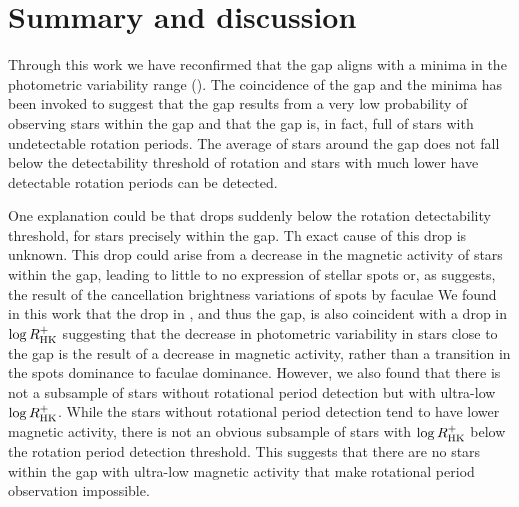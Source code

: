 \section{Summary and discussion}
\label{sec:summary}

Through this work we have reconfirmed that the gap aligns with a minima in the photometric variability range (\rper).
The coincidence of the gap and the minima has been invoked to suggest that the gap results from a very low probability of observing stars within the gap and that the gap is, in fact, full of stars with undetectable rotation periods.
The average \rper{} of stars around the gap does not fall below the detectability threshold of rotation and stars with much lower \rper{} have detectable rotation periods can be detected.

One explanation could be that \rper{} drops suddenly below the rotation detectability threshold, for stars precisely within the gap.
Th exact cause of this drop is unknown.
This drop could arise from a decrease in the magnetic activity of stars within the gap, leading to little to no expression of stellar spots or, as \citet{reinhold_transition_2019} suggests, the result of the cancellation brightness variations of spots by faculae 
We found in this work that the drop in \rper{}, and thus the gap, is also coincident with a drop in $\log R^{+}_{\rm{HK}}$ suggesting that the decrease in photometric variability in stars close to the gap is the result of a decrease in magnetic activity, rather than a transition in the spots dominance to faculae dominance.
However, we also found that there is not a subsample of stars without rotational period detection but with ultra-low $\log R^{+}_{\rm{HK}}$.
While the stars without rotational period detection tend to have lower magnetic activity, there is not an obvious subsample of stars with $\log R^{+}_{\rm{HK}}$ below the rotation period detection threshold.
This suggests that there are no stars within the gap with ultra-low magnetic activity that make rotational period observation impossible.

